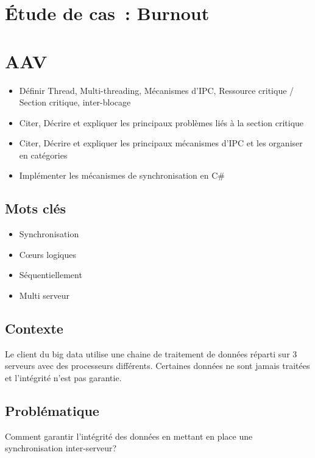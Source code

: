 \newpage
\section*{Étude de cas~: Burnout}

\section*{AAV}
\begin{itemize}
	\item [1] Définir Thread, Multi-threading, Mécanismes d'IPC, Ressource critique / Section critique, inter-blocage
	\item [1] Citer, Décrire et expliquer les principaux problèmes liés à la section critique
	\item [1] Citer, Décrire et expliquer les principaux mécanismes d'IPC et les organiser en catégories
	\item [3] Implémenter les mécanismes de synchronisation en C\#
\end{itemize}

\newpage

\subsection*{Mots clés}
{}
\begin{itemize}
	\item Synchronisation
	\item Cœurs logiques
	\item Séquentiellement
	\item Multi serveur
\end{itemize}

\subsection*{Contexte}
{}
\noindent Le client du big data utilise une chaine de traitement de données réparti sur 3 serveurs avec des processeurs différents. Certaines données ne sont jamais traitées et l’intégrité n’est pas garantie.

\subsection*{Problématique}
{}
\noindent Comment garantir l’intégrité des données en mettant en place une synchronisation inter-serveur?

